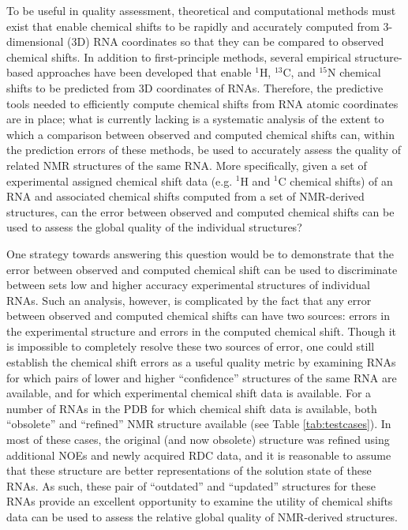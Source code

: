 \documentclass[fleqn,10pt]{wlscirep}
\begin{document}
To be useful in quality assessment, theoretical and computational methods must exist that enable chemical shifts to be rapidly and accurately computed from 3-dimensional (3D) RNA coordinates so that they can be compared to observed chemical shifts. In addition to first-principle methods, several empirical structure-based approaches have been developed that enable $^{1}$H, $^{13}$C, and $^{15}$N chemical shifts to be predicted from 3D coordinates of RNAs\cite{dejaegere1999empirical,cromsigt2001prediction, frank2013prediction,frank2014simple, frank2016can}. Therefore, the predictive tools needed to efficiently compute chemical shifts from RNA atomic coordinates are in place; what is currently lacking is a systematic analysis of the extent to which a comparison between observed and computed chemical shifts can, within the prediction errors of these methods, be used to accurately assess the quality of related NMR structures of the same RNA. More specifically, given a set of experimental assigned chemical shift data (e.g. $^{1}$H and $^{1}$C chemical shifts) of an RNA and associated chemical shifts computed from a set of NMR-derived structures, can the error between observed and computed chemical shifts can be used to assess the global quality of the individual structures?

One strategy towards answering this question would be to demonstrate that the error between observed and computed chemical shift can be used to discriminate between sets low and higher accuracy experimental structures of individual RNAs.  Such an analysis, however, is complicated by the fact that any error between observed and computed chemical shifts can have two sources:  errors in the experimental structure and errors in the computed chemical shift. Though it is impossible to completely resolve these two sources of error, one could still establish the chemical shift errors as a useful quality metric by examining RNAs for which pairs of lower and higher ``confidence'' structures of the same RNA are available, and for which experimental chemical shift data is available. For a number of RNAs in the PDB for which chemical shift data is available, both ``obsolete'' and ``refined'' NMR structure available (see Table \ref{tab:testcases}). In most of these cases, the original (and now obsolete)  structure was refined using additional NOEs and newly acquired RDC data, and it is reasonable to assume that these structure are better representations of the solution state of these RNAs. As such, these pair of ``outdated'' and ``updated'' structures for these RNAs provide an excellent opportunity to examine the utility of chemical shifts data can be used to assess the relative global quality of NMR-derived structures.
\end{document}
